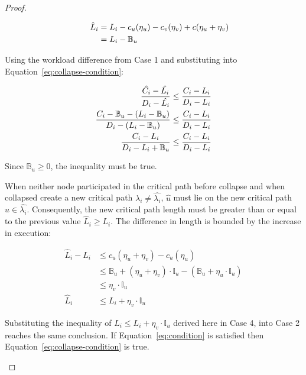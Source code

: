 \begin{theorem}
\begin{proof}
\begin{case}
      \begin{align*}
        \indent
        \hat{L}_i &= L_i - c_u(\eta_u) - c_v(\eta_v) + c(\eta_u +
            \eta_v) \\
        &= L_i - \mathbb{B}_u
      \end{align*}

      Using the workload difference from Case 1 and substituting into
      Equation~\ref{eq:collapse-condition}:

      \begin{align*}
        \indent
        \frac{\hat{C_i} - \hat{L_i}} 
             {D_i - \hat{L_i}} &\le
        \frac{C_i - L_i} 
             {D_i - L_i} \\
        \frac{C_i - \mathbb{B}_u - (L_i - \mathbb{B}_u)}
             {D_i - (L_i - \mathbb{B}_u)}
             &\le
        \frac{C_i - L_i} 
             {D_i - L_i} \\
        \frac{C_i - L_i}
             {D_i - L_i + \mathbb{B}_u}
             &\le
        \frac{C_i - L_i} 
             {D_i - L_i}
      \end{align*}

      Since ${\mathbb{B}_u \ge 0}$, the inequality must be true.
    \end{case}

    
    \begin{case}
      When neither node participated in the critical path before
      collapse and when collapsed create a new critical path
      ${\lambda_i \not = \hat{\lambda_i}}$, ${\hat{u}}$
      must lie on the new critical path
      ${\hat{u} \in \hat{\lambda_i}}$. Consequently, the
      new critical path length must be greater than or equal to the
      previous value ${\hat{L}_i \ge L_i}$. The difference in length
      is bounded by the increase in execution:

      \begin{align*}
        \hat{L}_i - L_i &\le c_u(\eta_u + \eta_v) - c_u(\eta_u) \\
        &\le \mathbb{B}_u + (\eta_u + \eta_v) \cdot \mathbb{I}_u
            - (\mathbb{B}_u + \eta_u \cdot \mathbb{I}_u) \\
        &\le \eta_v \cdot \mathbb{I}_u \\
        \hat{L}_i & \le L_i + \eta_v \cdot \mathbb{I}_u
      \end{align*}

      Substituting the inequality of
      ${\hat{L}_i \le L_i + \eta_v \cdot \mathbb{I}_u}$ derived here in
      Case 4, into Case 2 reaches the same conclusion. If
      Equation~\ref{eq:condition} is satisfied then
      Equation~\ref{eq:collapse-condition} is true.
    \end{case}


\end{proof}
\end{theorem}
